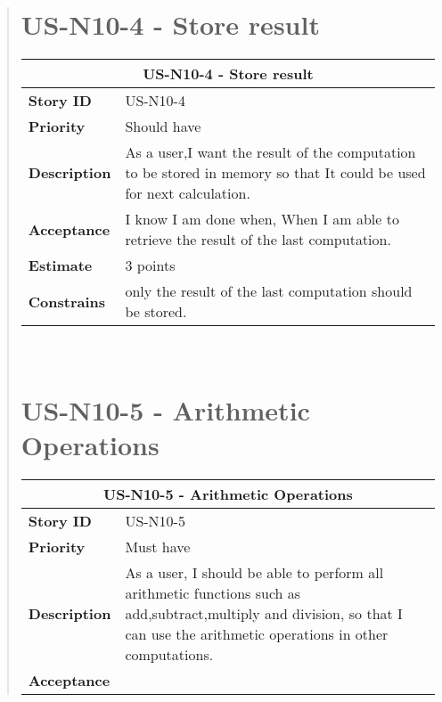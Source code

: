 \documentclass[12pt]{report}
\begin{document}
\begin{quote}
             \section{US-N10-4 - Store result}
                \begin{tabular}{ |p{4cm}|p{10cm}| }
                 \hline
                 \multicolumn{2}{|c|}{\textbf{US-N10-4 - Store result} } \\
                 \hline
                 \textbf {Story ID}& US-N10-4  \\
                 \hline
                 \textbf{Priority} & Should have \\
                 \hline
                 \textbf{Description}   & As a user,I want the result of the computation to be stored in memory so that It could be used for next calculation.  \\
                 \hline
                 \textbf{Acceptance}& 
                
                 I know I am done when,  When I am able to retrieve the result of the last computation. \\
                 \hline
                 \textbf{Estimate} &  3  points  \\
                 \hline
                 \textbf{Constrains}& only the result of the last computation should be stored.   \\
                 \hline
                            \hline
                \end{tabular}
            \hfill\break\\
            
            
            
               \section{US-N10-5 - Arithmetic Operations}
                \begin{tabular}{ |p{4cm}|p{10cm}| }
                 \hline
                 \multicolumn{2}{|c|}{\textbf{US-N10-5 - Arithmetic Operations} } \\
                 \hline
                 \textbf {Story ID}& US-N10-5  \\
                 \hline
                 \textbf{Priority} & Must have \\
                 \hline
                 \textbf{Description}   & As a user, I should be able to perform all arithmetic functions such as add,subtract,multiply and division, so that I can use the arithmetic operations in other computations. \\
                 \hline
                 \textbf{Acceptance}& 
                

\end{tabular}
\end{quote}
\end{document}
